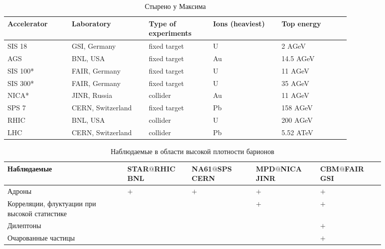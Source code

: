 
\todo

\begin{table}[H]
\caption{Стырено у Максима}
\label{tabl:Accelerators}
\begin{tabular}{ | p{0.15\linewidth} | p{0.18\linewidth} | p{0.15\linewidth} | p{0.16\linewidth} | p{0.16\linewidth} | }
\hline
Accelerator & Laboratory & Type of experiments & Ions (heaviest) & Top energy \\
\hline
SIS 18 & GSI, Germany & fixed target & U & 2 AGeV \\
\hline
AGS & BNL, USA & fixed target & Au & 14.5 AGeV \\
\hline
SIS 100* & FAIR, Germany & fixed target & U & 11 AGeV \\
\hline
SIS 300* & FAIR, Germany & fixed target & U & 35 AGeV \\
\hline
NICA* & JINR, Russia & collider & Au & 11 AGeV \\
\hline
SPS 7 & CERN, Switzerland & fixed target & Pb & 158 AGeV \\
\hline
RHIC & BNL, USA & collider & U & 200 AGeV \\
\hline
LHC & CERN, Switzerland & collider & Pb & 5.52 ATeV \\
\hline
\end{tabular}
\end{table}


\todo


\begin{table}[H]
\caption{Наблюдаемые в области высокой плотности барионов}
\label{tabl:Experiments2}
\begin{tabular}{ | p{0.28\linewidth} | p{0.15\linewidth} | p{0.15\linewidth} | p{0.15\linewidth} | p{0.15\linewidth} | }
\hline
\textbf{Наблюдаемые} & \textbf{STAR$@$RHIC} \newline \textbf{BNL} & \textbf{NA61$@$SPS} \newline \textbf{CERN} & \textbf{MPD$@$NICA} \newline \textbf{JINR} & \textbf{CBM$@$FAIR} \newline \textbf{GSI} \\
\hline
Адроны & $+$ & $+$ & $+$ & $+$ \\
\hline
Корреляции, флуктуации \newline при высокой статистике & & & $+$ & $+$ \\
\hline
Дилептоны & & & & $+$ \\
\hline
Очарованные \newline частицы & & & & $+$ \\
\hline
\end{tabular}
\end{table}

